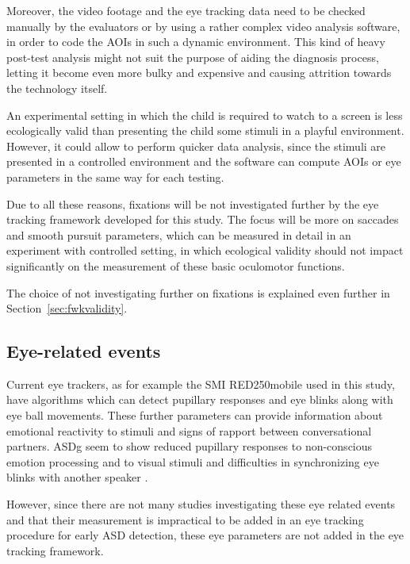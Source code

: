 Moreover, the video footage and the eye tracking data need to be checked manually by the evaluators or by using a rather complex video analysis software, in order to code the AOIs in such a dynamic environment. This kind of heavy post-test analysis might not suit the purpose of aiding the diagnosis process, letting it become even more bulky and expensive and causing attrition towards the technology itself.

An experimental setting in which the child is required to watch to a screen is less ecologically valid than presenting the child some stimuli in a playful environment. However, it could allow to perform quicker data analysis, since the stimuli are presented in a controlled environment and the software can compute AOIs or eye parameters in the same way for each testing.

Due to all these reasons, fixations will be not investigated further by the eye tracking framework developed for this study. The focus will be more on saccades and smooth pursuit parameters, which can be measured in detail in an experiment with controlled setting, in which ecological validity should not impact significantly on the measurement of these basic oculomotor functions.

The choice of not investigating further on fixations is explained even further in Section~\ref{sec:fwkvalidity}.



\subsection{Eye-related events}
\label{sec:eyerelatedevents}

Current eye trackers, as for example the SMI RED250mobile used in this study, have algorithms which can detect pupillary responses and eye blinks along with eye ball movements. These further parameters can provide information about emotional reactivity to stimuli and signs of rapport between conversational partners. ASDg seem to show reduced pupillary responses to non-conscious emotion processing and to visual stimuli \citep{nuske2014pupil,martineau2011pupil} and difficulties in synchronizing eye blinks with another speaker \citep{nakan02011blinks}.

However, since there are not many studies investigating these eye related events and that their measurement is impractical to be added in an eye tracking procedure for early ASD detection, these eye parameters are not added in the eye tracking framework.

